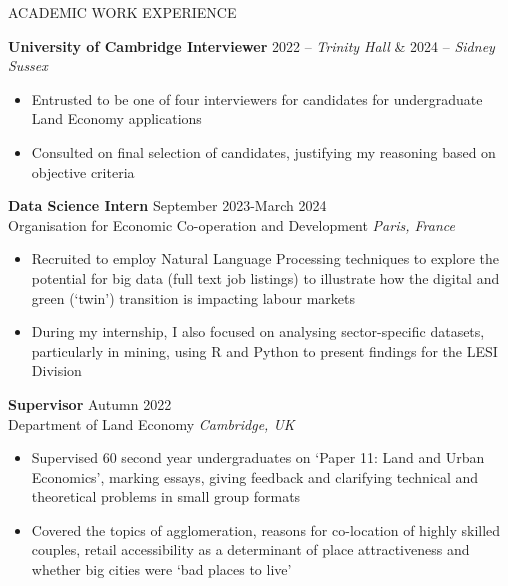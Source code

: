 \documentclass{resume} %
\begin{document}
\begin{rSection}{ACADEMIC WORK EXPERIENCE}


\textbf{University of Cambridge Interviewer} \hfill  \hfill 2022 -- \textit{Trinity Hall}  \& 2024 -- \textit{Sidney Sussex}
\vspace{-0.5em}
 \begin{itemize}
    \itemsep -3pt {} 
     \item Entrusted to be one of four interviewers for candidates for undergraduate Land Economy applications 
     \item Consulted on final selection of candidates, justifying my reasoning based on objective criteria
 \end{itemize}

 
\textbf{Data Science Intern} \hfill September 2023-March 2024 \\
Organisation for Economic Co-operation and Development \hfill \textit{Paris, France}
\vspace{-0.5em}
 \begin{itemize}
    \itemsep -3pt {} 
     \item Recruited to employ Natural Language Processing techniques to explore the potential for big data (full text job listings) to illustrate how the digital and green (`twin') transition is impacting labour markets
      \item During my internship, I also focused on analysing sector-specific datasets, particularly in mining, using R and Python to present findings for the LESI Division
 \end{itemize}

\textbf{Supervisor} \hfill Autumn 2022 \\
Department of Land Economy \hfill \textit{Cambridge, UK}
\vspace{-0.5em}
 \begin{itemize}
    \itemsep -3pt {} 
     \item Supervised 60 second year undergraduates on `Paper 11: Land and Urban Economics', marking essays, giving feedback and clarifying technical and theoretical problems in small group formats
     \item Covered the topics of agglomeration, reasons for co-location of highly skilled couples, retail accessibility as a determinant of place attractiveness and whether big cities were `bad places to live'
 \end{itemize}


\end{rSection}
\end{document}
